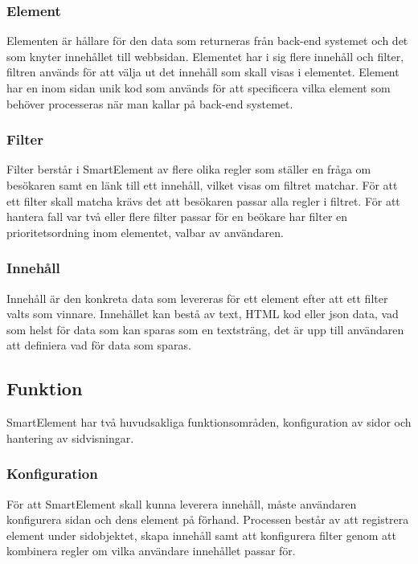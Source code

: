 \subsubsection{Element}

Elementen är hållare för den data som returneras från back-end systemet och det som knyter innehållet till webbsidan. Elementet har i sig flere innehåll och filter, filtren används för att välja ut det innehåll som skall visas i elementet. Element har en inom sidan unik kod som används för att specificera vilka element som behöver processeras när man kallar på back-end systemet.

\subsubsection{Filter}

Filter berstår i SmartElement av flere olika regler som ställer en fråga om besökaren samt en länk till ett innehåll, vilket visas om filtret matchar. För att ett filter skall matcha krävs det att besökaren passar alla regler i filtret. För att hantera fall var två eller flere filter passar för en beökare har filter en prioritetsordning inom elementet, valbar av användaren.

\subsubsection{Innehåll}

Innehåll är den konkreta data som levereras för ett element efter att ett filter valts som vinnare. Innehållet kan bestå av text, HTML kod eller \gls{json} data, vad som helst för data som kan sparas som en textsträng, det är upp till användaren att definiera vad för data som sparas.

\subsection{Funktion}

SmartElement har två huvudsakliga funktionsområden, konfiguration av sidor och hantering av sidvisningar.

\subsubsection{Konfiguration}

För att SmartElement skall kunna leverera innehåll, måste användaren konfigurera sidan och dens element på förhand. Processen består av att registrera element under sidobjektet, skapa innehåll samt att konfigurera filter genom att kombinera regler om vilka användare innehållet passar för.

